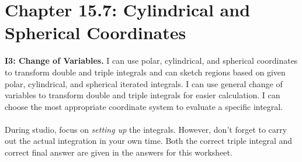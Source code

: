 
\fancyhead[R]{\daynineteen}

\section*{\centering Chapter 15.7: Cylindrical and Spherical Coordinates}
\textbf{I3: Change of Variables.} I can use polar, cylindrical, and spherical coordinates to transform double and triple integrals and can sketch regions based on given polar, cylindrical, and spherical iterated integrals. I can use general change of variables to transform double and triple integrals for easier calculation.  I can choose the most appropriate coordinate system to evaluate a specific integral.\\\\
During studio, focus on \textit{setting up} the integrals. However, don't forget to carry out the actual integration in your own time. Both the correct triple integral and correct final answer are given in the answers for this worksheet.

